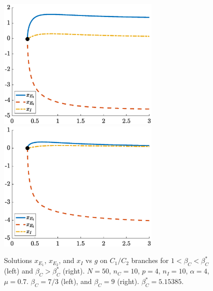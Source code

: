 \documentclass[reqno]{siamonline190516}
\begin{document}
\begin{figure}
    \centering
    \includegraphics[width=7.8cm]{images/clusterbeforebetacstar.eps}
    \includegraphics[width=7.8cm]{images/clusterafterbetacstar.eps}
    \caption{Solutions $x_{E_1}$, $x_{E_2}$, and $x_I$ vs $g$ on $C_1/C_2$ branches for $1 < \beta_C < \beta_C^*$ (left) and $\beta_C > \beta_C^*$ (right). $N = 50$, $n_C = 10$, $p = 4$, $n_I = 10$, $\alpha =4$, $\mu = 0.7$. $\beta_C = 7/3$ (left), and $\beta_C = 9$ (right). $\beta_C^* = 5.15385$.}
    \label{fig:betacstar}
\end{figure}
\end{document}
